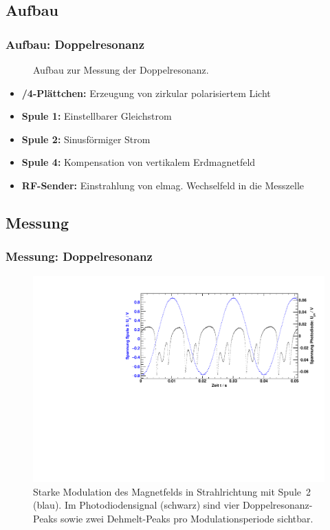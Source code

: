 \subsection{Aufbau}
\begin{frame}
\frametitle{Aufbau: Doppelresonanz}

\begin{figure}
    \centering
    \def\svgwidth{\textwidth}
    
    \caption{Aufbau zur Messung der Doppelresonanz.}
\end{figure}

\begin{itemize}
  \item \textbf{\textlambda/4-Plättchen:} Erzeugung von zirkular polarisiertem Licht
  \item \textbf{Spule 1:} Einstellbarer Gleichstrom
  \item \textbf{Spule 2:} Sinusförmiger Strom
  \item \textbf{Spule 4:} Kompensation von vertikalem Erdmagnetfeld
  \item \textbf{RF-Sender:} Einstrahlung von elmag. Wechselfeld in die Messzelle
\end{itemize}

\end{frame}




\subsection{Messung}

\begin{frame}
\frametitle{Messung: Doppelresonanz}
\begin{figure}
\begin{center}
  \includegraphics[width=\textwidth]{../img/06.pdf}
  \caption{Starke Modulation des Magnetfelds in Strahlrichtung mit Spule~2 (blau).
   Im Photodiodensignal (schwarz) sind vier Doppelresonanz-Peaks sowie
   zwei Dehmelt-Peaks pro Modulationsperiode sichtbar.}
  \label{img:dehmeltrf}
\end{center}
\end{figure}
\end{frame}

